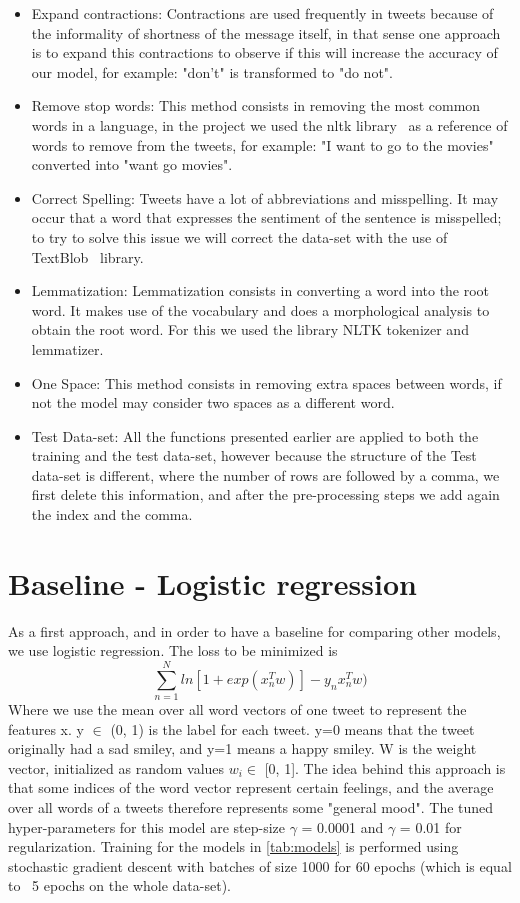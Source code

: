 \documentclass[10pt,conference,compsocconf]{IEEEtran}
\begin{document}
\begin{itemize}
\item Expand contractions: Contractions are used frequently in tweets because of the informality of shortness of the message itself, in that sense one approach is to expand this contractions to observe if this will increase the accuracy of our model, for example: "don't" is transformed to "do not".

\item Remove stop words: This method consists in removing the most common words in a language, in the project we used the nltk library~\cite{nltk01} as a reference of words to remove from the tweets, for example: "I want to go to the movies" converted into "want go movies". 

\item Correct Spelling: Tweets have a lot of abbreviations and misspelling. It may occur that a word that expresses the sentiment of the sentence is misspelled; to try to solve this issue we will correct the data-set with the use of TextBlob~\cite{Textblob01} library. 

\item Lemmatization: Lemmatization consists in converting a word into the root word. It makes use of the vocabulary and does a morphological analysis to obtain the root word. For this we used the library NLTK tokenizer and lemmatizer.

\item One Space: This method consists in removing extra spaces between words, if not the model may consider two spaces as a different word.

\item Test Data-set: All the functions presented earlier are applied to both the training and the test data-set, however because the structure of the Test data-set is different, where the number of rows are followed by a comma, we first delete this information, and after the pre-processing steps we add again the index and the comma.

\end{itemize}

\section{Baseline - Logistic regression}
As a first approach, and in order to have a baseline for comparing other models, we use logistic regression. The loss to be minimized is
\[\sum_{n=1}^{N}ln[1+exp(x^T_nw)]-y_nx_n^Tw)\]
Where we use the mean over all word vectors of one tweet to represent the features x. y $\in$ (0, 1) is the label for each tweet. y=0 means that the tweet originally had a sad smiley, and y=1 means a happy smiley. W is the weight vector, initialized as random values $w_i \in$ [0, 1]. The idea behind this approach is that some indices of the word vector represent certain feelings, and the average over all words of a tweets therefore represents some "general mood". The tuned hyper-parameters for this model are step-size $\gamma$ = 0.0001 and $\gamma$ = 0.01 for regularization. Training for the models in \ref{tab:models} is performed using stochastic gradient descent with batches of size 1000 for 60 epochs (which is equal to ~5 epochs on the whole data-set).
\end{document}
